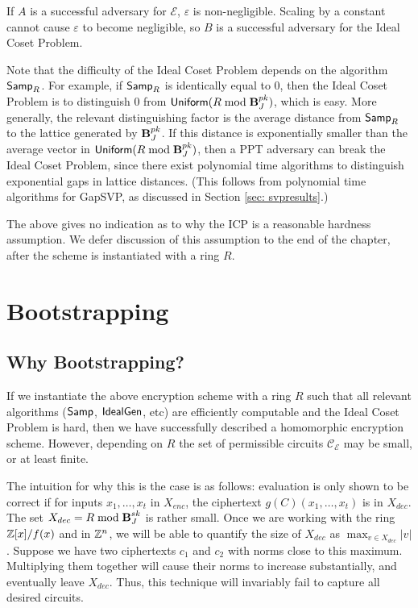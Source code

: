 If $A$ is a successful adversary for $\mathcal{E}$, $\varepsilon$ is non-negligible. Scaling by a constant cannot cause $\varepsilon$ to become negligible, so $B$ is a successful adversary for the Ideal Coset Problem.

Note that the difficulty of the Ideal Coset Problem depends on the algorithm ${\sf Samp}_R$. For example, if ${\sf Samp}_R$ is identically equal to $0$, then the Ideal Coset Problem is to distinguish $0$ from ${\sf Uniform}(R \bmod \textbf{B}_J^{pk})$, which is easy. More generally, the relevant distinguishing factor is the average distance from ${\sf Samp}_R$ to the lattice generated by $\textbf{B}_J^{pk}$. If this distance is exponentially smaller than the average vector in ${\sf Uniform}(R \bmod \textbf{B}_J^{pk})$, then a PPT adversary can break the Ideal Coset Problem, since there exist polynomial time algorithms to distinguish exponential gaps in lattice distances. (This follows from polynomial time algorithms for GapSVP, as discussed in Section \ref{sec: svpresults}.)

The above gives no indication as to why the ICP is a reasonable hardness assumption. We defer discussion of this assumption to the end of the chapter, after the scheme is instantiated with a ring $R$.



\section{Bootstrapping}
\subsection{Why Bootstrapping?}
\label{sec:whybootstrap}
If we instantiate the above encryption scheme with a ring $R$ such that all relevant algorithms (${\sf Samp}$, ${\sf IdealGen}$, etc) are efficiently computable and the Ideal Coset Problem is hard, then we have successfully described a homomorphic encryption scheme. However, depending on $R$ the set of permissible circuits $\mathcal{C}_\mathcal{E}$ may be small, or at least finite.

The intuition for why this is the case is as follows: evaluation is only shown to be correct if for inputs $x_1, \dots, x_t$ in $X_{enc}$, the ciphertext $g(C)(x_1, \dots, x_t)$ is in $X_{dec}$. The set $X_{dec} = R \bmod \textbf{B}_J^{sk}$ is rather small. Once we are working with the ring $\mathbb{Z}[x] / f(x)$ and in $\mathbb{Z}^n$, we will be able to quantify the size of $X_{dec}$ as $\max_{v \in X_{dec}} |v|$. Suppose we have two ciphertexts $c_1$ and $c_2$ with norms close to this maximum. Multiplying them together will cause their norms to increase substantially, and eventually leave $X_{dec}$. Thus, this technique will invariably fail to capture all desired circuits.


